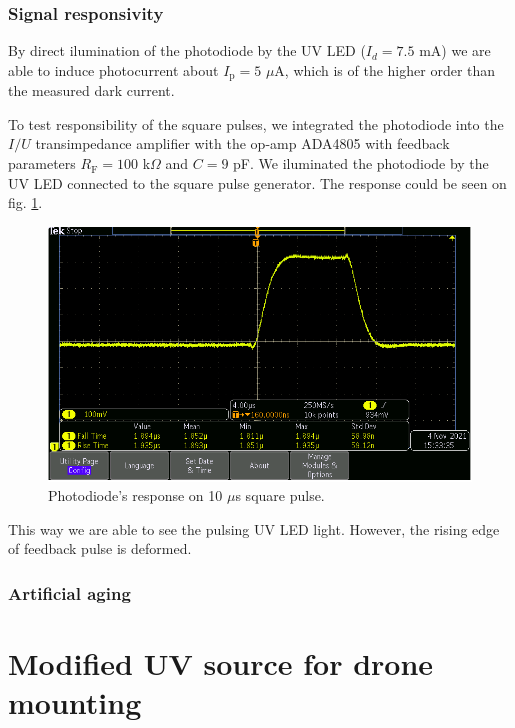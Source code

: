 \subsubsection{Signal responsivity}
By direct ilumination of the photodiode by the UV LED ($I_d = 7.5 $ mA) we are able to induce photocurrent about $I_\textrm{p} = 5$ $\mu$A, which is of the higher order than the measured dark current.
\par
To test responsibility of the square pulses, we integrated the photodiode into the $I/U$ transimpedance amplifier with the op-amp ADA4805 with feedback parameters $R_\textrm{F} = 100$ k$\Omega$ and $C = 9$ pF. We iluminated the photodiode by the UV LED connected to the square pulse generator. The response could be seen on fig. \ref{response}.

\begin{figure}[H]
 \centering
 \includegraphics[scale=0.5]{./pictures/pulse}
 \caption{Photodiode's response on 10 $\mu$s square pulse.}
 \label{response}
\end{figure}


This way we are able to see the pulsing UV LED light. However, the rising edge of feedback pulse is deformed. 

\subsubsection{Artificial aging}


\section{Modified UV source for drone mounting}



